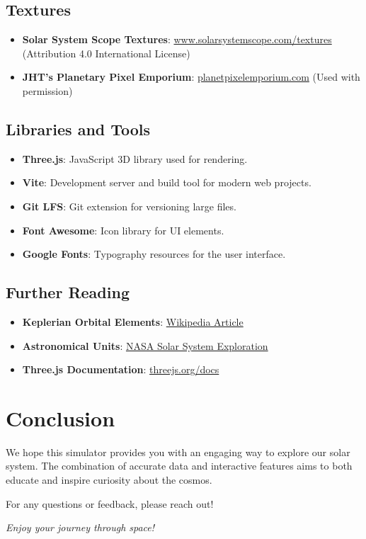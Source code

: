 \documentclass[12pt, a4paper]{article}
\begin{document}
\subsection{Textures}

\begin{itemize}
    \item \textbf{Solar System Scope Textures}: \href{https://www.solarsystemscope.com/textures/}{www.solarsystemscope.com/textures} (Attribution 4.0 International License)
    \item \textbf{JHT's Planetary Pixel Emporium}: \href{https://planetpixelemporium.com/}{planetpixelemporium.com} (Used with permission)
\end{itemize}

\subsection{Libraries and Tools}

\begin{itemize}
    \item \textbf{Three.js}: JavaScript 3D library used for rendering.
    \item \textbf{Vite}: Development server and build tool for modern web projects.
    \item \textbf{Git LFS}: Git extension for versioning large files.
    \item \textbf{Font Awesome}: Icon library for UI elements.
    \item \textbf{Google Fonts}: Typography resources for the user interface.
\end{itemize}

\subsection{Further Reading}

\begin{itemize}
    \item \textbf{Keplerian Orbital Elements}: \href{https://en.wikipedia.org/wiki/Orbital_elements}{Wikipedia Article}
    \item \textbf{Astronomical Units}: \href{https://solarsystem.nasa.gov/astrophysics/solar-system/}{NASA Solar System Exploration}
    \item \textbf{Three.js Documentation}: \href{https://threejs.org/docs/}{threejs.org/docs}
\end{itemize}

\section{Conclusion}

We hope this simulator provides you with an engaging way to explore our solar
system. The combination of accurate data and interactive features aims to both
educate and inspire curiosity about the cosmos.

For any questions or feedback, please reach out!

\vfill

\begin{center}
    \textit{Enjoy your journey through space!}
\end{center}
\end{document}
